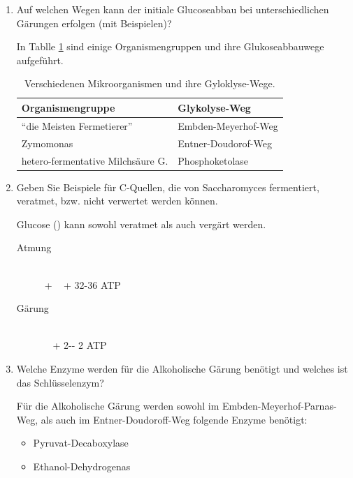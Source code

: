\begin{enumerate}
	\item Auf welchen Wegen kann der initiale Glucoseabbau bei unterschiedlichen Gärungen erfolgen (mit Beispielen)?
	
		In Tablle \ref{tab:fermenterglyoklyse} sind einige Organismengruppen und ihre Glukoseabbauwege aufgeführt.	
		\begin{table}[h!]
		\begin{center}
		\begin{tabular}{l l} 
		\toprule
			Organismengruppe			&	Glykolyse-Weg\\
			\midrule
			``die Meisten Fermetierer''		&	Embden-Meyerhof-Weg\\
			Zymomonas							&	Entner-Doudorof-Weg\\
			hetero-fermentative Milchsäure G.			&	Phosphoketolase\\
		\bottomrule
		\end{tabular}
		\caption{Verschiedenen Mikroorganismen und ihre Gyloklyse-Wege.}
		\label{tab:fermenterglyoklyse}
		\end{center}
		\end{table}

	\item Geben Sie Beispiele für C-Quellen, die von Saccharomyces fermentiert, veratmet, bzw. nicht verwertet werden können.

	Glucose () kann sowohl veratmet als auch vergärt werden.	
		\begin{description}
			\item[Atmung] \hfill\\
				 +  \textrightarrow \  +  \hfill 32-36 ATP	
			\item[Gärung] \hfill\\
				 \textrightarrow \  + 2-- \hfill 2 ATP
		\end{description}

	\item Welche Enzyme werden für die Alkoholische Gärung benötigt und welches ist das Schlüsselenzym?

		Für die Alkoholische Gärung werden sowohl im Embden-Meyerhof-Parnas-Weg,
		als auch im Entner-Doudoroff-Weg folgende Enzyme benötigt:
		\begin{itemize}
			\item Pyruvat-Decaboxylase
			\item Ethanol-Dehydrogenas
		\end{itemize}
		

\end{enumerate}
